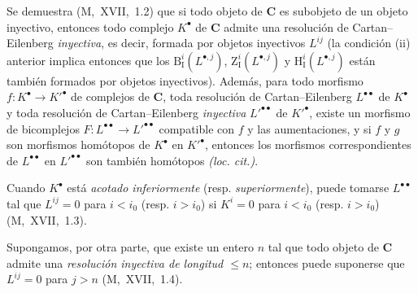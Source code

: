 \begin{env}[11.4.2]
Se demuestra (M,~XVII,~1.2) que si todo objeto de $\boldsymbol{C}$ es subobjeto de un objeto inyectivo, entonces todo complejo $K^\bullet$ de $\boldsymbol{C}$ admite una resolución de Cartan--Eilenberg \emph{inyectiva}, es decir, formada por objetos inyectivos $L^{ij}$ (la condición (ii) anterior implica entonces que los $\mathrm B_{\mathrm I}^i(L^{\bullet,j})$, $\mathrm Z_{\mathrm I}^i(L^{\bullet,j})$ y
$\mathrm H_{\mathrm I}^i(L^{\bullet,j})$ están también formados por objetos inyectivos).
Además, para todo morfismo $f:K^\bullet\to K'^\bullet$ de complejos de $\boldsymbol{C}$,
toda resolución de Cartan--Eilenberg $L^{\bullet\bullet}$ de $K^\bullet$ y toda resolución de Cartan--Eilenberg \emph{inyectiva} $L'^{\bullet\bullet}$ de $K'^\bullet$, existe un morfismo de bicomplejos $F:L^{\bullet\bullet}\to L'^{\bullet\bullet}$ compatible con $f$ y las aumentaciones, y si $f$ y $g$ son morfismos homótopos de $K^\bullet$ en $K'^\bullet$, entonces los morfismos correspondientes de $L^{\bullet\bullet}$ en $L'^{\bullet\bullet}$ son también homótopos \emph{(loc. cit.)}.

Cuando $K^\bullet$ está \emph{acotado inferiormente} (resp. \emph{superiormente}), puede tomarse $L^{\bullet\bullet}$ tal que $L^{ij}=0$ para $i<i_0$ (resp. $i>i_0$) si $K^i=0$ para $i<i_0$ (resp. $i>i_0$) (M,~XVII,~1.3).

Supongamos, por otra parte, que existe un entero $n$ tal que todo objeto de $\boldsymbol{C}$ admite una \emph{resolución inyectiva de longitud $\leq n$};
entonces puede suponerse que $L^{ij}=0$ para $j>n$ (M,~XVII,~1.4).
\end{env}



